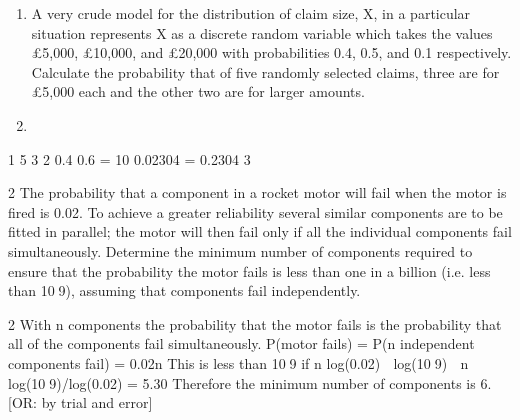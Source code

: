 \documentclass[a4paper,12pt]{article}
\begin{document}
\begin{enumerate}
\item A very crude model for the distribution of claim size, X, in a particular situation
represents X as a discrete random variable which takes the values £5,000, £10,000,
and £20,000 with probabilities 0.4, 0.5, and 0.1 respectively.
Calculate the probability that of five randomly selected claims, three are for £5,000
each and the other two are for larger amounts. 
\item 
 
\end{enumerate}
\newpage

1 5 3 2
0.4 0.6 = 10 0.02304 = 0.2304
3
 
  
 

2 The probability that a component in a rocket motor will fail when the motor is fired is
0.02. To achieve a greater reliability several similar components are to be fitted in
parallel; the motor will then fail only if all the individual components fail
simultaneously.
Determine the minimum number of components required to ensure that the
probability the motor fails is less than one in a billion (i.e. less than 109), assuming
that components fail independently. 


2 With n components the probability that the motor fails is the probability that all of the
components fail simultaneously.
P(motor fails) = P(n independent components fail) = 0.02n
This is less than 109 if n log(0.02)  log(109)  n  log(109)/log(0.02) = 5.30
Therefore the minimum number of components is 6.
[OR: by trial and error]
\end{document}
